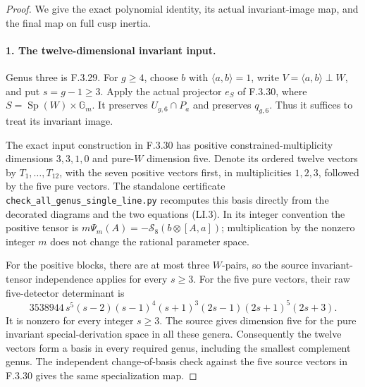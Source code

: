 \begin{proof}
We give the exact polynomial identity, its actual invariant-image
map, and the final map on full cusp inertia.

\paragraph{1. The twelve-dimensional invariant input.}
Genus three is F.3.29. For $g\geq4$, choose
$b$ with $\langle a,b\rangle=1$, write
$V=\langle a,b\rangle\perp W$, and put $s=g-1\geq3$.
Apply the actual projector $e_S$ of F.3.30, where
$S=\operatorname{Sp}(W)\times\mathbb G_m$.
It preserves $U_{g,6}\cap P_a$ and preserves $q_{g,6}$.
Thus it suffices to treat its invariant image.

The exact input construction in F.3.30 has positive
constrained-multiplicity dimensions $3,3,1,0$ and
pure-$W$ dimension five. Denote its ordered twelve
vectors by $T_1,\ldots,T_{12}$, with the seven positive
vectors first, in multiplicities $1,2,3$, followed by
the five pure vectors. The standalone certificate
\texttt{check\_all\_genus\_single\_line.py} recomputes this
basis directly from the decorated diagrams and the two
equations (LI.3). In its integer convention the positive
tensor is $m\Psi_m(A)=-\mathcal S_8(b\otimes[A,a])$;
multiplication by the nonzero integer $m$ does not change
the rational parameter space.

For the positive blocks, there are at most three $W$-pairs,
so the source invariant-tensor independence applies for
every $s\geq3$\cite[Proposition~2.1, p.~8]{AuditMoritaSakasaiSuzuki2015v2}.
For the five pure vectors, their raw five-detector determinant is
\[
 3538944\,s^5(s-2)(s-1)^4(s+1)^3(2s-1)(2s+1)^5(2s+3).
                                                               \tag{UC.2}
\]
It is nonzero for every integer $s\geq3$. The source gives
dimension five for the pure invariant special-derivation
space in all these genera\cite[Proposition~7.2, pp.~26--27]{AuditMoritaSakasaiSuzuki2015v2}.
Consequently the twelve vectors form a basis in every
required genus, including the smallest complement genus.
The independent change-of-basis check against the five
source vectors in F.3.30 gives the same specialization map.


\end{proof}
